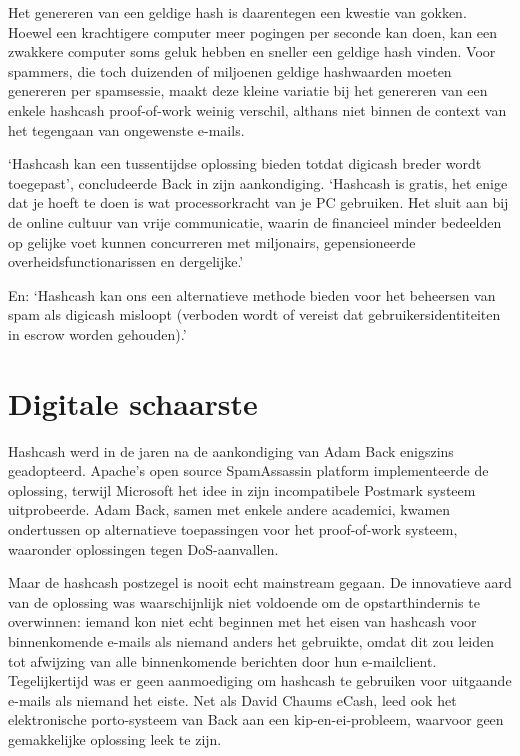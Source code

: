 \documentclass[
  a5paper,
  smalldemyvopaper,11pt,twoside,onecolumn,openright,extrafontsizes,
hidelinks]{memoir}
\begin{document}
Het genereren van een geldige hash is daarentegen een kwestie van
gokken. Hoewel een krachtigere computer meer pogingen per seconde kan
doen, kan een zwakkere computer soms geluk hebben en sneller een geldige
hash vinden. Voor spammers, die toch duizenden of miljoenen geldige
hashwaarden moeten genereren per spamsessie, maakt deze kleine variatie
bij het genereren van een enkele hashcash proof-of-work weinig verschil,
althans niet binnen de context van het tegengaan van ongewenste e-mails.

`Hashcash kan een tussentijdse oplossing bieden totdat digicash breder
wordt toegepast', concludeerde Back in zijn aankondiging. `Hashcash is
gratis, het enige dat je hoeft te doen is wat processorkracht van je PC
gebruiken. Het sluit aan bij de online cultuur van vrije communicatie,
waarin de financieel minder bedeelden op gelijke voet kunnen concurreren
met miljonairs, gepensioneerde overheidsfunctionarissen en dergelijke.'

En: `Hashcash kan ons een alternatieve methode bieden voor het beheersen
van spam als digicash misloopt (verboden wordt of vereist dat
gebruikersidentiteiten in escrow worden gehouden).'

\section{Digitale schaarste}\label{digitale-schaarste}

Hashcash werd in de jaren na de aankondiging van Adam Back enigszins
geadopteerd. Apache's open source SpamAssassin platform implementeerde
de oplossing, terwijl Microsoft het idee in zijn incompatibele Postmark
systeem uitprobeerde. Adam Back, samen met enkele andere academici,
kwamen ondertussen op alternatieve toepassingen voor het proof-of-work
systeem, waaronder oplossingen tegen DoS-aanvallen.

Maar de hashcash postzegel is nooit echt mainstream gegaan. De
innovatieve aard van de oplossing was waarschijnlijk niet voldoende om
de opstarthindernis te overwinnen: iemand kon niet echt beginnen met het
eisen van hashcash voor binnenkomende e-mails als niemand anders het
gebruikte, omdat dit zou leiden tot afwijzing van alle binnenkomende
berichten door hun e-mailclient. Tegelijkertijd was er geen aanmoediging
om hashcash te gebruiken voor uitgaande e-mails als niemand het eiste.
Net als David Chaums eCash, leed ook het elektronische porto-systeem van
Back aan een kip-en-ei-probleem, waarvoor geen gemakkelijke oplossing
leek te zijn.
\end{document}
